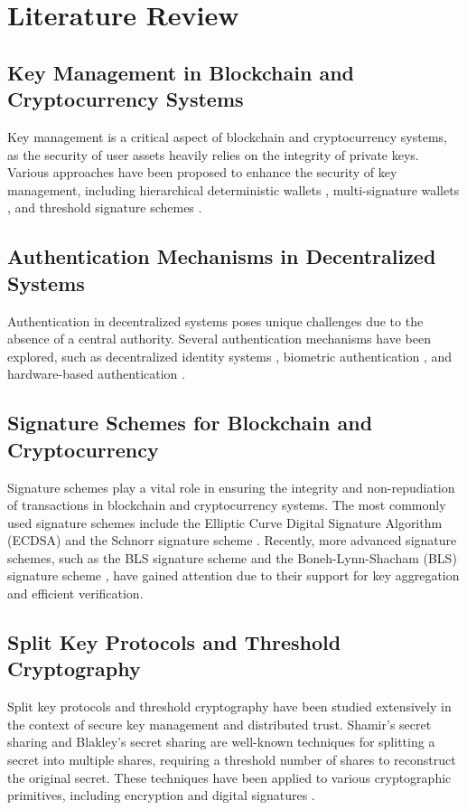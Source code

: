 \chapter{Literature Review} %
\label{Chapter2} %
\section{Key Management in Blockchain and Cryptocurrency Systems}
Key management is a critical aspect of blockchain and cryptocurrency systems, as the security of user assets heavily relies on the integrity of private keys. Various approaches have been proposed to enhance the security of key management, including hierarchical deterministic wallets \cite{gutoski2015hierarchical}, multi-signature wallets \cite{karantias2020proof}, and threshold signature schemes \cite{gennaro2016threshold}.
\section{Authentication Mechanisms in Decentralized Systems}
Authentication in decentralized systems poses unique challenges due to the absence of a central authority. Several authentication mechanisms have been explored, such as decentralized identity systems \cite{muhle2018survey}, biometric authentication \cite{kaga2017secure}, and hardware-based authentication \cite{fan2019new}.
\section{Signature Schemes for Blockchain and Cryptocurrency}
Signature schemes play a vital role in ensuring the integrity and non-repudiation of transactions in blockchain and cryptocurrency systems. The most commonly used signature schemes include the Elliptic Curve Digital Signature Algorithm (ECDSA) \cite{johnson2001elliptic} and the Schnorr signature scheme \cite{schnorr1991efficient}. Recently, more advanced signature schemes, such as the BLS signature scheme \cite{boneh2001short} and the Boneh-Lynn-Shacham (BLS) signature scheme \cite{boneh2003aggregate}, have gained attention due to their support for key aggregation and efficient verification.
\section{Split Key Protocols and Threshold Cryptography}
Split key protocols and threshold cryptography have been studied extensively in the context of secure key management and distributed trust. Shamir's secret sharing \cite{shamir1979share} and Blakley's secret sharing \cite{blakley1979safeguarding} are well-known techniques for splitting a secret into multiple shares, requiring a threshold number of shares to reconstruct the original secret. These techniques have been applied to various cryptographic primitives, including encryption \cite{desmedt1988threshold} and digital signatures \cite{shoup2000practical}.

